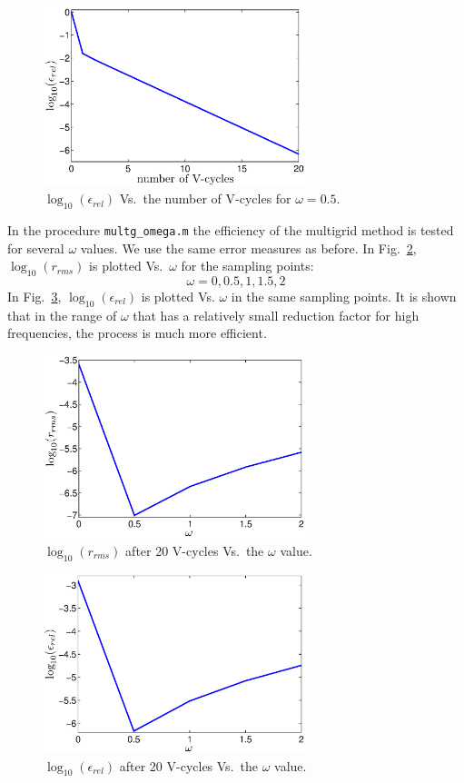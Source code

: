 \documentclass[12pt, a4paper]{article}
\begin{document}
\begin{figure}[htb]
	\centering\includegraphics[width=3in]{multigrideps}
	\caption{$\log_{10}(\epsilon_{rel})$ Vs.\ the number of V-cycles for $\omega=0.5$.}\label{fig:multe}
\end{figure}

In the procedure \texttt{multg\_omega.m} the efficiency of the multigrid method is tested for several $\omega$ values. We use the same error measures as before. In Fig.~\ref{fig:multwr}, $\log_{10}(r_{rms})$ is plotted Vs.~$\omega$ for the sampling points:
\[
	\omega = 0,0.5,1,1.5,2
\]
In Fig.~\ref{fig:multweps}, $\log_{10}(\epsilon_{rel})$ is plotted Vs. $\omega$ in the same sampling points. It is shown that in the range of $\omega$ that has a relatively small reduction factor for high frequencies, the process is much more efficient.

\begin{figure}[htb]
	\centering\includegraphics[width=3in]{multig_omega_r}
	\caption{$\log_{10}(r_{rms})$ after 20 V-cycles Vs.\ the $\omega$ value.}\label{fig:multwr}
\end{figure}

\begin{figure}[htb]
	\centering\includegraphics[width=3in]{multig_omega_eps}
	\caption{$\log_{10}(\epsilon_{rel})$ after 20 V-cycles Vs.\ the $\omega$ value.}\label{fig:multweps}
\end{figure}
\end{document}
